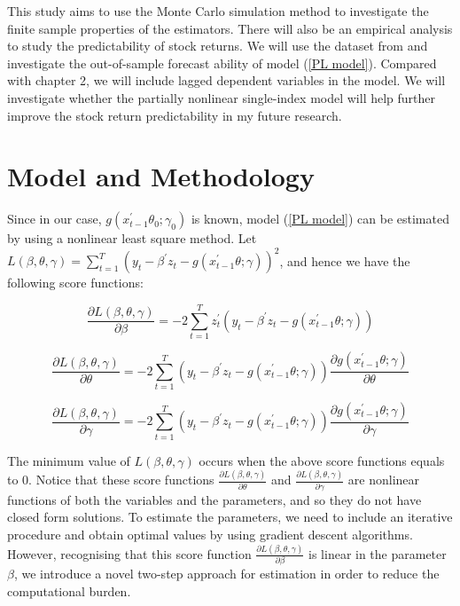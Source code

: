 \documentclass[a4paper,12pt,times,numbered,print,index]{report}
\numberwithin{equation}{section}
\begin{document}
	This study aims to use the Monte Carlo simulation method to investigate the finite sample properties of the estimators. There will also be an empirical analysis to study the predictability of stock returns. We will use the dataset from \cite{welch2008comprehensive} and investigate the out-of-sample forecast ability of model (\ref{PL model}). Compared with chapter 2, we will include lagged dependent variables in the model. We will investigate whether the partially nonlinear single-index model will help further improve the stock return predictability in my future research.  
	
	
	
	\section{Model and Methodology}
	
	Since in our case, $g\left( x_{t-1}^{\prime }\theta_0; \gamma_0\right)$ is known, model (\ref{PL model}) can be estimated by using a nonlinear least square method. Let $L(\beta, \theta, \gamma) = \sum_{t=1}^{T} \left( y_t - \beta^{\prime} z_t - g\left( x_{t-1}^{\prime }\theta; \gamma\right)\right) ^2$, and hence we have the following score functions:
	
	$$
	\frac{\partial L(\beta, \theta, \gamma)}{\partial \beta} = -2\sum_{t=1}^{T} z_t^{\prime} \left( y_t - \beta^{\prime} z_t - g\left( x_{t-1}^{\prime }\theta; \gamma\right)\right)
	$$
	
	$$
	\frac{\partial L(\beta, \theta, \gamma)}{\partial \theta} = -2\sum_{t=1}^{T} \left( y_t - \beta^{\prime} z_t - g\left( x_{t-1}^{\prime }\theta; \gamma\right)\right)\frac{\partial g(x_{t-1}^{\prime }\theta; \gamma)}{\partial \theta}
	$$
	
	$$
	\frac{\partial L(\beta, \theta, \gamma)}{\partial \gamma} = -2\sum_{t=1}^{T} \left( y_t - \beta^{\prime} z_t - g\left( x_{t-1}^{\prime }\theta; \gamma\right)\right) \frac{\partial g(x_{t-1}^{\prime }\theta; \gamma)}{\partial \gamma}
	$$
	
	The minimum value of $L(\beta, \theta, \gamma)$ occurs when the above score functions equals to 0. Notice that these score functions $\frac{\partial L(\beta, \theta, \gamma)}{\partial \theta}$ and $\frac{\partial L(\beta, \theta, \gamma)}{\partial \gamma}$ are nonlinear functions of both the variables and the parameters, and so they do not have closed form solutions. To estimate the parameters, we need to include an iterative procedure and obtain optimal values by using gradient descent algorithms. However, recognising that this score function $\frac{\partial L(\beta, \theta, \gamma)}{\partial \beta}$ is linear in the parameter $\beta$, we introduce a novel two-step approach for estimation in order to reduce the computational burden. 
	
\end{document}
